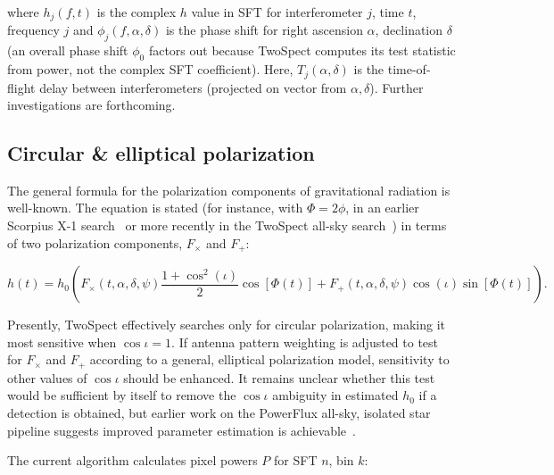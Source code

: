 \noindent where $h_{j}(f,t)$ is the complex $h$ value in SFT for interferometer $j$, time $t$, frequency $j$ and
$\phi_{j}(f,\alpha,\delta)$ is the phase shift for right ascension $\alpha$,
declination $\delta$ 
(an overall phase shift $\phi_{0}$ factors out because
TwoSpect computes its test statistic from power, not the complex SFT coefficient).
Here,
$T_{j}(\alpha,\delta)$ is the time-of-flight delay between interferometers 
(projected on vector from $\alpha,\delta$).
Further investigations are forthcoming.


\subsection{Circular \& elliptical polarization}
\label{circular_elliptical_polarization_TwoSpect}



The general formula for the polarization components of gravitational radiation is well-known.
The equation is stated (for instance, with $\Phi=2\phi$, in an earlier Scorpius X-1 search~\cite{AbbottScoX12007} or more recently in the TwoSpect all-sky search~\cite{GoetzTwoSpectResults2014}) in terms of two polarization components, $F_\times$ and $F_+$:

\begin{equation}
h(t)=h_{0} \left(F_{\times}(t,\alpha,\delta,\psi)\frac{1+\cos^{2}(\iota)}{2}\cos[\Phi(t)]+
F_{+}(t,\alpha,\delta,\psi)\cos(\iota)\sin[\Phi(t)]\right).
\label{TwoSpect_pol_effect}
\end{equation}

Presently, TwoSpect effectively searches only for circular polarization, making it most sensitive when $\cos \iota = 1$.
If antenna pattern weighting is adjusted to test for $F_\times$ and $F_+$ according to a general, elliptical polarization model, sensitivity to other values of $\cos \iota$ should be enhanced.
It remains unclear whether this test would be sufficient by itself to remove the $\cos \iota$ ambiguity in estimated $h_0$ if a detection is obtained, but earlier work on the PowerFlux all-sky, isolated star pipeline suggests improved parameter estimation is achievable~\cite{DergachevRiles2005,MendellWette2008}.

The current algorithm calculates pixel powers $P$ for SFT $n$, bin $k$:

